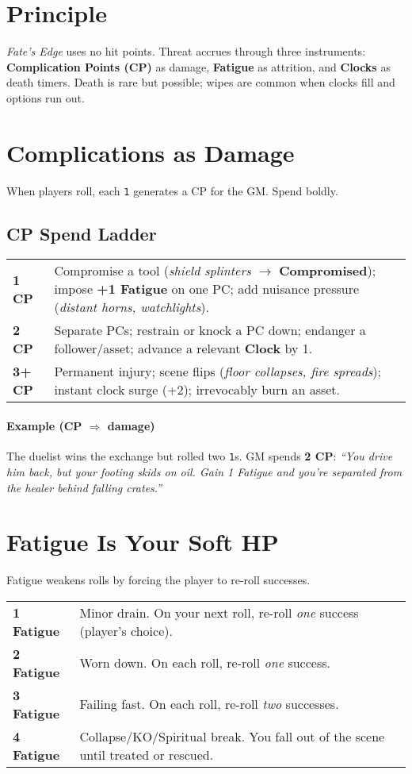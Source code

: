 \documentclass[12pt]{article}
\begin{document}
\section{Principle}
\emph{Fate's Edge} uses no hit points. Threat accrues through three instruments:
\textbf{Complication Points (CP)} as damage, \textbf{Fatigue} as attrition, and \textbf{Clocks} as death timers.
Death is rare but possible; wipes are common when clocks fill and options run out.

\section{Complications as Damage}
When players roll, each \texttt{1} generates a CP for the GM. Spend boldly.

\subsection*{CP Spend Ladder}
\begin{tabular}{@{}p{1.2cm}p{12cm}@{}}
\toprule
\textbf{1 CP} & Compromise a tool (\emph{shield splinters} $\rightarrow$ \textbf{Compromised}); impose \textbf{+1 Fatigue} on one PC; add nuisance pressure (\emph{distant horns, watchlights}).\\
\textbf{2 CP} & Separate PCs; restrain or knock a PC down; endanger a follower/asset; advance a relevant \textbf{Clock} by 1.\\
\textbf{3+ CP} & Permanent injury; scene flips (\emph{floor collapses, fire spreads}); instant clock surge (+2); irrevocably burn an asset.\\
\bottomrule
\end{tabular}

\paragraph{Example (CP $\Rightarrow$ damage)}
The duelist wins the exchange but rolled two \texttt{1}s. GM spends \textbf{2 CP}:
\emph{``You drive him back, but your footing skids on oil. Gain 1 Fatigue and you're separated from the healer behind falling crates.''}

\section{Fatigue Is Your Soft HP}
Fatigue weakens rolls by forcing the player to re-roll successes.

\begin{tabular}{@{}p{3cm}p{10.5cm}@{}}
\toprule
\textbf{1 Fatigue} & Minor drain. On your next roll, re-roll \emph{one} success (player's choice).\\
\textbf{2 Fatigue} & Worn down. On each roll, re-roll \emph{one} success.\\
\textbf{3 Fatigue} & Failing fast. On each roll, re-roll \emph{two} successes.\\
\textbf{4 Fatigue} & Collapse/KO/Spiritual break. You fall out of the scene until treated or rescued.\\
\bottomrule
\end{tabular}
\end{document}
